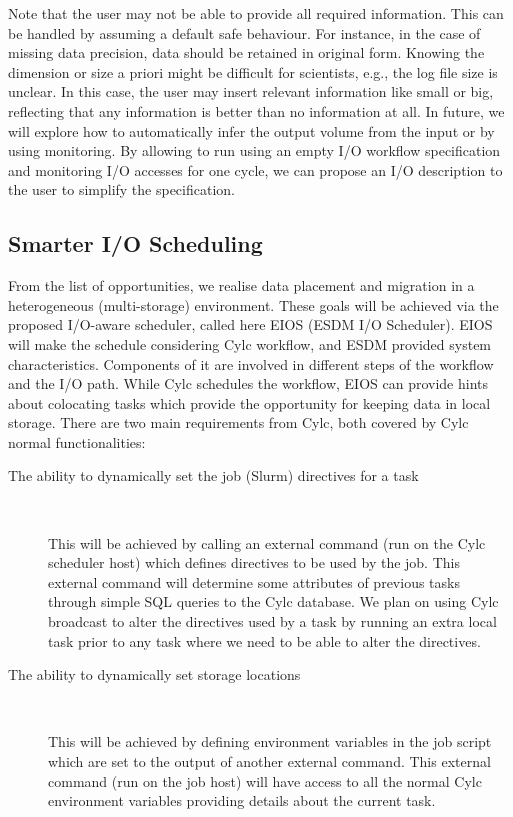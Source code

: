 \documentclass{superfri}
\begin{document}
Note that the user may not be able to provide all required information.
This can be handled by assuming a default safe behaviour.
For instance, in the case of missing data precision, data should be retained in original form.
Knowing the dimension or size a priori might be difficult for scientists, e.g., the log file size is unclear.
In this case, the user may insert relevant information like small or big, reflecting that any information is better than no information at all.
In future, we will explore how to automatically infer the output volume from the input or by using monitoring.
By allowing to run using an empty I/O workflow specification and monitoring I/O accesses for one cycle, we can propose an I/O description to the user to simplify the specification.

\subsection{Smarter I/O Scheduling}

From the list of opportunities, we realise data placement and migration in a heterogeneous (multi-storage) environment.
These goals will be achieved via the proposed I/O-aware scheduler, called here EIOS (ESDM I/O Scheduler).
EIOS will make the schedule considering Cylc workflow, and ESDM provided system characteristics.
Components of it are involved in different steps of the workflow and the I/O path.
While Cylc schedules the workflow, EIOS can provide hints about colocating tasks which provide the opportunity for keeping data in local storage.
There are two main requirements from Cylc, both covered by Cylc normal functionalities:

\begin{description}

\item[The ability to dynamically set the job (Slurm) directives for a task]

\ \\ \vspace{-0.5cm}

This will be achieved by calling an external command (run on the Cylc scheduler host) which defines directives to be used by the job. This external command will determine some attributes of previous tasks through simple SQL queries to the Cylc database. We plan on using Cylc broadcast to alter the directives used by a task by running an extra local task prior to any task where we need to be able to alter the directives.

\item[The ability to dynamically set storage locations]

\ \\ \vspace{-0.5cm}

This will be achieved by defining environment variables in the job script which are set to the output of another external command. This external command (run on the job host) will have access to all the normal Cylc environment variables providing details about the current task.

\end{description}
\end{document}
